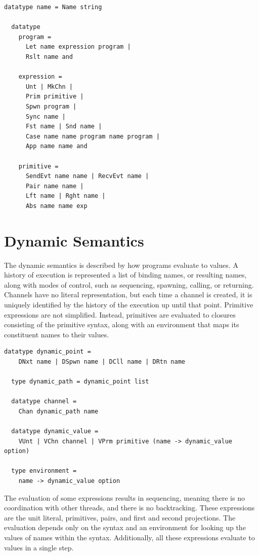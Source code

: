\documentclass{article}
\begin{document}
\begin{lstlisting}[language=logic, escapechar=\%]
  datatype name = Name string

  datatype 
    program = 
      Let name expression program |
      Rslt name and 

    expression = 
      Unt | MkChn |
      Prim primitive |
      Spwn program |
      Sync name |
      Fst name | Snd name |
      Case name name program name program |
      App name name and 

    primitive = 
      SendEvt name name | RecvEvt name |
      Pair name name |
      Lft name | Rght name |
      Abs name name exp
  \end{lstlisting}

\section{Dynamic Semantics}
The dynamic semantics is described by how programs evaluate to values.
A history of execution is
represented a list of binding names, or resulting names, along with modes of control, such as
sequencing, spawning, calling, or returning. Channels have no literal representation, but each
time a channel is created, it is uniquely identified by the history of the execution up until
that point. Primitive expressions are not simplified.  Instead, primitives are evaluated to
closures consisting of the primitive syntax, along with an environment that maps its
constituent names to their values.

\begin{lstlisting}[language=logic, escapechar=\%]
  datatype dynamic_point =
    DNxt name | DSpwn name | DCll name | DRtn name 

  type dynamic_path = dynamic_point list

  datatype channel =
    Chan dynamic_path name 

  datatype dynamic_value = 
    VUnt | VChn channel | VPrm primitive (name -> dynamic_value option)

  type environment =
    name -> dynamic_value option
  \end{lstlisting}

The evaluation of some expressions results in sequencing, meaning there is no coordination
with other threads, and there is no backtracking. These expressions are the
unit literal, primitives, pairs, and first and second projections. The evaluation depends only
on the syntax and an environment for looking up the values of names within the syntax.
Additionally, all these expressions evaluate to values in a single step.
\end{document}
